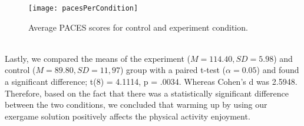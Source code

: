 \begin{figure}[h]
    \centering
    \texttt{[image: pacesPerCondition]}
    \caption{Average PACES scores for control and experiment condition.}
\label{fig:pacesPerCondition}
\end{figure}\\
Lastly, we compared the means of the experiment (\begin{math}M = 114.40 , SD = 5.98\end{math}) and control (\begin{math}M = 89.80, SD = 11,97\end{math}) group with a paired t-test (\begin{math}\alpha = 0.05\end{math}) and found a significant difference; t(8) = 4.1114, p = .0034. Whereas Cohen's d was 2.5948. Therefore, based on the fact that there was a statistically significant difference between the two conditions, we concluded that warming up by using our exergame solution positively affects the physical activity enjoyment.

